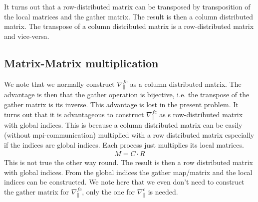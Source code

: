\documentclass{hitec} %
\begin{document}
It turns out that a row-distributed matrix can be transposed
by transposition of the local matrices and the gather matrix.
The result is then a column distributed matrix.
The transpose of a column distributed matrix is a row-distributed matrix and vice-versa.

\subsection{Matrix-Matrix multiplication}
We note that we normally construct $\nabla_\parallel^{fc}$ as a column 
distributed
matrix. The advantage is then that the gather operation is bijective, i.e. the transpose of the gather matrix is its inverse. 
This advantage is lost in the present problem. 
It turns out that it is advantageous to construct $\nabla_\parallel^{fc}$
as s row-distributed matrix with global indices. 
This is because a column distributed matrix can be easily (without mpi-communication) multiplied
with a row distributed matrix especially if the indices are global indices. 
Each process just multiplies its local matrices.
\begin{align}
M = C\cdot R
\end{align}
This is not true the other way round. 
The result is then a row distributed matrix with global indices. 
From the global indices the gather map/matrix and the local
indices can be constructed.
We note here that we even don't need to construct the gather matrix
for $\nabla_\parallel^{fc}$, only the one for $\nabla_\parallel^c$ is
needed.




%



\end{document}
